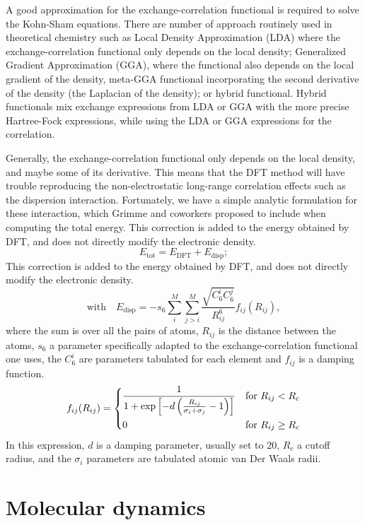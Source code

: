 \documentclass[thesis]{subfiles}
\begin{document}
A good approximation for the exchange-correlation functional is required to
solve the Kohn-Sham equations. There are number of approach routinely used in
theoretical chemistry such as Local Density Approximation (LDA) where the
exchange-correlation functional only depends on the local density; Generalized
Gradient Approximation (GGA), where the functional also depends on the local
gradient of the density, meta-GGA functional incorporating the second derivative
of the density (the Laplacian of the density); or hybrid functional. Hybrid
functionals mix exchange expressions from LDA or GGA with the more precise
Hartree-Fock  expressions, while using the LDA or GGA
expressions for the correlation.

Generally, the exchange-correlation functional only depends on the local
density, and maybe some of its derivative. This means that the DFT method will
have trouble reproducing the non-electrostatic long-range correlation effects
such as the dispersion interaction. Fortunately, we have a simple analytic
formulation for these interaction, which Grimme and coworkers\cite{Grimme2006}
proposed to include when computing the total energy. This correction is added to
the energy obtained by DFT, and does not directly modify the electronic density.
\[E_\text{tot} = E_\text{DFT} + E_\text{disp}; \]
This correction is added to the energy obtained by DFT, and does not directly
modify the electronic density.
\[\text{with}\quad E_\text{disp} = - s_6 \sum_i^M\sum_{j>i}^M\frac{\sqrt{C_6^i C_6^j}}{R_{ij}^6} f_{ij}(R_{ij}),\]
where the sum is over all the pairs of atoms, $R_{ij}$ is the distance between
the atoms, $s_6$ a parameter specifically adapted to the exchange-correlation
functional one uses, the $C_6^i$ are parameters tabulated for each element and
$f_{ij}$ is a damping function.
\[f_{ij}(R_{ij}) =
\begin{dcases}
    \frac{1}{1 + \exp\left[-d \left(\frac{R_{ij}}{\sigma_i + \sigma_j} -1\right)\right]} &\text{for } R_{ij} < R_c \\
    0 &\text{for } R_{ij} \geq R_c \\
\end{dcases}\]
In this expression, $d$ is a damping parameter, usually set to 20, $R_c$ a
cutoff radius, and the $\sigma_i$ parameters are tabulated atomic van Der Waals
radii.

\section{Molecular dynamics}
\end{document}
